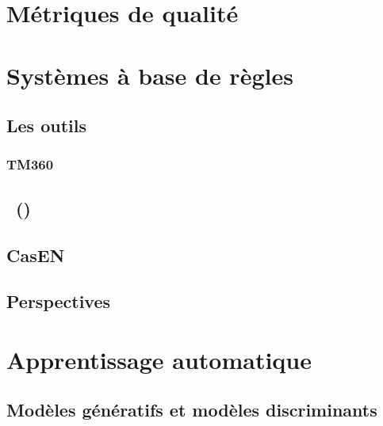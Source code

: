 \documentclass[12pt,a4paper,times,twoside,openright]{report}
\begin{document}
    \section{Métriques de qualité}
    \label{sec:NER-quality-measurement}
    
    
    \section{Systèmes à base de règles}
    \label{sec:rule-based-systems}
    
        \subsection{Les outils \Luxid}
        \label{subsec:Luxid}
        
            \subsubsection{TM360}
            \label{subsubsec:TM360}
            
        
        \subsection{\ESSEX\ (\ExpertSystem)}
        
        
        \subsection{CasEN}
        
        
        \subsection{Perspectives}
        
    
    \section{Apprentissage automatique}
    \label{sec:machine-learning}
    
        
        \subsection{Modèles génératifs et modèles discriminants}
        \label{subsec:generative-vs-discriminative}
        
        
\end{document}

